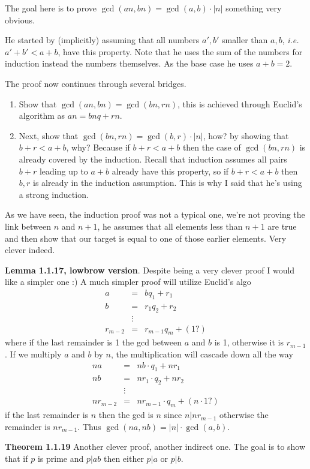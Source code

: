 \documentclass[aps,preprint,preprintnumbers,nofootinbib,showpacs,prd]{revtex4-1}
\newcommand{\ie}{{\it i.e.} }
\newcommand{\nbea}{\begin{eqnarray*}}
\newcommand{\neea}{\end{eqnarray*}}
\begin{document}
The goal here is to prove $\gcd(an,bn) = \gcd(a,b) \cdot |n|$ something very obvious.

He started by (implicitly) assuming that all numbers $a',b'$ smaller than $a,b$, \ie $a'+b' < a+b$, have this property. Note that he uses the sum of the numbers for induction instead the numbers themselves. As the base case he uses $a + b = 2$.

The proof now continues through several bridges. 
\begin{enumerate}
\item Show that $\gcd(an,bn) = \gcd(bn,rn)$, this is achieved through Euclid's algorithm as $an = bnq + rn$.
\item Next, show that $\gcd(bn, rn) = \gcd(b,r) \cdot |n|$, how? by showing that $b + r < a + b$, why? Because if $b + r < a + b$ then the case of $\gcd(bn, rn)$ is already covered by the induction. Recall that induction assumes all pairs $b + r$ leading up to $a + b$ already have this property, so if $b + r < a + b$ then $b,r$ is already in the induction assumption. This is why I said that he's using a strong induction.
\end{enumerate}
As we have seen, the induction proof was not a typical one, we're not proving the link between $n$ and $n+1$, he assumes that all elements less than $n+1$ are true and then show that our target is equal to one of those earlier elements. Very clever indeed.

{\bf Lemma 1.1.17,  lowbrow version}. Despite being a very clever proof I would like a simpler one :) A much simpler proof will utilize Euclid's algo
%
\nbea
a & = & bq_1 + r_1 \\
b & = & r_1q_2 + r_2 \\
& \vdots & \\
r_{m-2} & = & r_{m-1} q_m + (1?)
\neea
%
where if the last remainder is 1 the gcd between $a$ and $b$ is 1, otherwise it is $r_{m-1}$. If we multiply $a$ and $b$ by $n$, the multiplication will cascade down all the way
%
\nbea
na & = & nb \cdot q_1 + nr_1 \\
nb & = & nr_1 \cdot q_2 + nr_2 \\
& \vdots & \\
nr_{m-2} & = & nr_{m-1} \cdot q_m + (n \cdot 1?)
\neea
%
if the last remainder is $n$ then the gcd is $n$ since $ n | nr_{m-1}$ otherwise the remainder is $nr_{m-1}$. Thus $\gcd(na,nb) = |n| \cdot \gcd(a,b)$.

{\bf Theorem 1.1.19} Another clever proof, another indirect one. The goal is to show that if $p$ is prime and $p|ab$ then either $p|a$ or $p|b$.
\end{document}
